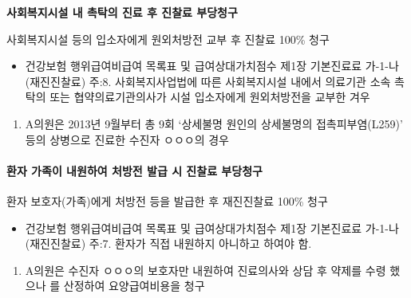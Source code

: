\textbf{사회복지시설 내 촉탁의 진료 후 진찰료 부당청구}
\begin{commentbox}{사회복지시설 등의 입소자에게 원외처방전 교부 후 진찰료 100\% 청구}
\begin{description}\tightlist
\item[관련근거] 
\begin{itemize}\tightlist
\item 건강보험 행위급여\cntrdot{}비급여 목록표 및 급여상대가치점수 제1장 기본진료료 가-1-나(재진진찰료) 주:8. 사회복지사업법에 따른 사회복지시설 내에서 의료기관 소속 촉탁의 또는 협약의료기관의사가 시설 입소자에게 원외처방전을 교부한 겨우 
\end{itemize}
\item[부당사례]
\begin{enumerate}[1)]\tightlist
\item A의원은 2013년 9월부터 총 9회 ‘상세불명 원인의 상세불명의 접촉피부염(L259)’ 등의 상병으로 진료한 수진자 ㅇㅇㅇ의 경우 
\end{enumerate}
\end{description}
\end{commentbox}

\paragraph{환자 가족이 내원하여 처방전 발급 시 진찰료 부당청구}\par
환자 보호자(가족)에게 처방전 등을 발급한 후 재진진찰료 100\% 청구
\begin{description}\tightlist
\item[관련근거] 
\begin{itemize}\tightlist
\item 건강보험 행위급여\cntrdot{}비급여 목록표 및 급여상대가치점수 제1장 기본진료료 가-1-나(재진진찰료) 주:7. 환자가 직접 내원하지 아니하고 하여야 함.
\end{itemize}
\item[부당사례]
\begin{enumerate}[1)]\tightlist
\item  A의원은 수진자 ㅇㅇㅇ의 보호자만 내원하여 진료의사와 상담 후 약제를 수령 했으나 를 산정하여 요양급여비용을 청구
\end{enumerate}
\end{description}


